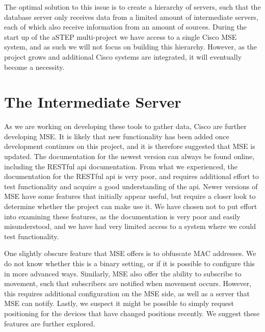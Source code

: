 The optimal solution to this issue is to create a hierarchy of servers, such that the database server only receives data from a limited amount of intermediate servers, each of which also receive information from an amount of sources. During the start up of the aSTEP multi-project we have access to a single Cisco MSE system, and as such we will not focus on building this hierarchy. However, as the project grows and additional Cisco systems are integrated, it will eventually become a necessity.

\section{The Intermediate Server}\label{sec:future_intermediate}
As we are working on developing these tools to gather data, Cisco are further developing MSE. It is likely that new functionality has been added once development continues on this project, and it is therefore suggested that MSE is updated. The documentation for the newest version can always be found online, including the RESTful api documentation. From what we experienced, the documentation for the RESTful api is very poor, and requires additional effort to test functionality and acquire a good understanding of the api. Newer versions of MSE have some features that initially appear useful, but require a closer look to determine whether the project can make use it. We have chosen not to put effort into examining these features, as the documentation is very poor and easily misunderstood, and we have had very limited access to a system where we could test functionality.

One slightly obscure feature that MSE offers is to obfuscate MAC addresses. We do not know whether this is a binary setting, or if it is possible to configure this in more advanced ways. Similarly, MSE also offer the ability to subscribe to movement, such that subscribers are notified when movement occurs. However, this requires additional configuration on the MSE side, as well as a server that MSE can notify. Lastly, we suspect it might be possible to simply request positioning for the devices that have changed positions recently. We suggest these features are further explored.

 



